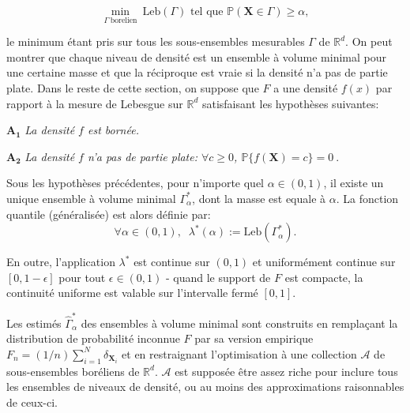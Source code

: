 \documentclass[a4paper, 12pt]{article}
\def\mb{\mathbf}
\def\rset{\mathbb{R}}
\def\leb{\text{Leb}}
\begin{document}
\begin{equation}\label{resume_fr:eq:MV}\min_{\Gamma~ \text{borelien}} ~\leb(\Gamma) \mbox{~tel que~} \mathbb{P}(\mb X \in \Gamma) \ge \alpha,
\end{equation}

le minimum étant pris sur tous les sous-ensembles mesurables $ \Gamma $ de $ \rset^d $.
On peut montrer que chaque niveau de densité est un ensemble à volume minimal pour une certaine masse et que la réciproque est vraie si la densité n'a pas de partie plate.
Dans le reste de cette section, on suppose que $F$ a une densité $ f(x) $ par rapport à la mesure de Lebesgue sur $ \rset^d $ satisfaisant les hypothèses suivantes:

\noindent $\mathbf{A_1}$ {\it La densité $f$ est bornée.}%

\noindent $\mathbf{A_2}$ {\it La densité $f$ n'a pas de partie plate: $\forall c\geq 0$, $\mathbb{P}\{f(\mb X)=c\}=0~.$}

Sous les hypothèses précédentes, pour n'importe quel $\alpha\in (0,1)$, il existe un unique ensemble à volume minimal $\Gamma_\alpha^*$, dont la masse est equale à $\alpha$.
La fonction quantile (généralisée) est alors définie par:
$$
\forall \alpha\in (0,1),\;\; \lambda^*(\alpha) := \leb(\Gamma^*_{\alpha}).
$$

En outre, l'application $ \lambda^* $ est continue sur $(0,1)$ et uniformément continue sur $ [0,1- \epsilon] $ pour tout $ \epsilon \in (0,1) $ - quand le support de $ F $ est compacte, la continuité uniforme est valable sur l'intervalle fermé $[0,1] $.


Les estimés $ \widehat {\Gamma}^*_{\alpha} $ des ensembles à volume minimal sont construits en remplaçant la distribution de probabilité inconnue $ F $ par sa version empirique $ F_n = (1 / n) \sum_ {i = 1} ^ N \delta _ {\mb X_i} $ et en restraignant l'optimisation à une collection $ \mathcal{A} $ de sous-ensembles boréliens de $ \rset^d $. $ \mathcal {A} $ est supposée être assez riche pour inclure tous les ensembles de niveaux de densité, ou au moins des approximations raisonnables de ceux-ci.
\end{document}
